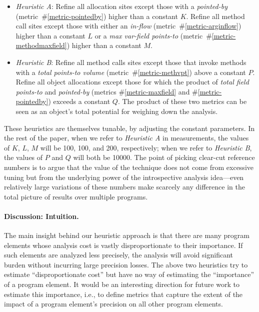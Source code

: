 \begin{itemize}
\item \emph{Heuristic A}: Refine all allocation sites except those
  with a \emph{pointed-by} (metric~\#\ref{metric-pointedby}) higher than
  a constant $K$.  Refine all method call sites except those with
  either an \emph{in-flow} (metric~\#\ref{metric-arginflow}) higher than
  a constant $L$ or a \emph{max var-field points-to}
  (metric~\#\ref{metric-methodmaxfield}) higher than a constant $M$.

\item \emph{Heuristic B}: Refine all method calls sites except those
  that invoke methods with a \emph{total points-to volume}
  (metric~\#\ref{metric-methvpt}) above a constant $P$. Refine all
  object allocations except those for which the product of \emph{total
    field points-to} and \emph{pointed-by} (metrics
  \#\ref{metric-maxfield} and \#\ref{metric-pointedby}) exceeds a
  constant $Q$. The product of these two metrics can be seen as an
  object's total potential for weighing down the analysis.
\end{itemize}

These heuristics are themselves tunable, by adjusting the constant
parameters.  In the rest of the paper, when we refer to
\emph{Heuristic A} in measurements, the values of $K$, $L$, $M$ will
be 100, 100, and 200, respectively; when we refer to \emph{Heuristic
  B}, the values of $P$ and $Q$ will both be 10000. The point of
picking clear-cut reference numbers is to argue that the value of the
technique does not come from excessive tuning but from the underlying
power of the introspective analysis idea---even relatively large variations of
these numbers make scarcely any difference in the total picture of
results over multiple programs.

\paragraph{Discussion: Intuition.} 
The main insight behind our heuristic approach is that there are many
program elements whose analysis cost is vastly disproportionate to
their importance. If such elements are analyzed less precisely, the
analysis will avoid significant burden without incurring large
precision losses. The above two heuristics try to estimate
``disproportionate cost'' but have no way of estimating the
``importance'' of a program element. It would be an interesting
direction for future work to estimate this importance, i.e., to define
metrics that capture the extent of the impact of a program element's
precision on all other program elements.


